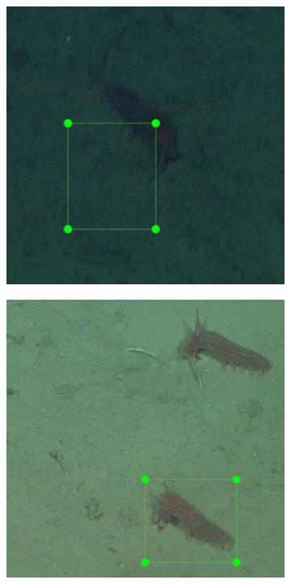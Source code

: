 \documentclass[12pt,a4paper,twoside,openany]{report}
\begin{document}
\begin{figure}[H]
\begin{subfigure}[b]{0.45\textwidth}
        \includegraphics[width=\textwidth]{figs/implementation/fathomnet_problems/inaccurate.png}
        \label{fig:fathomnet_inaccurate}
    \end{subfigure}
    \hfill
    \begin{subfigure}[b]{0.45\textwidth}
        \centering
        \includegraphics[width=\textwidth]{figs/implementation/fathomnet_problems/missing.png}

\end{subfigure}
\end{figure}
\end{document}
